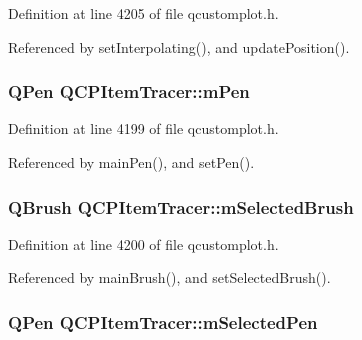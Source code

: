 Definition at line 4205 of file qcustomplot.\+h.



Referenced by set\+Interpolating(), and update\+Position().

\hypertarget{class_q_c_p_item_tracer_a579e3bd6bd16d6aaff03638dc8a99a69}{}
\subsubsection[{m\+Pen}]{\setlength{\rightskip}{0pt plus 5cm}Q\+Pen Q\+C\+P\+Item\+Tracer\+::m\+Pen\hspace{0.3cm}{\ttfamily [protected]}}\label{class_q_c_p_item_tracer_a579e3bd6bd16d6aaff03638dc8a99a69}


Definition at line 4199 of file qcustomplot.\+h.



Referenced by main\+Pen(), and set\+Pen().

\hypertarget{class_q_c_p_item_tracer_a1c15d2adde40efdcc0ef1ff78fd256a6}{}
\subsubsection[{m\+Selected\+Brush}]{\setlength{\rightskip}{0pt plus 5cm}Q\+Brush Q\+C\+P\+Item\+Tracer\+::m\+Selected\+Brush\hspace{0.3cm}{\ttfamily [protected]}}\label{class_q_c_p_item_tracer_a1c15d2adde40efdcc0ef1ff78fd256a6}


Definition at line 4200 of file qcustomplot.\+h.



Referenced by main\+Brush(), and set\+Selected\+Brush().

\hypertarget{class_q_c_p_item_tracer_a3f61829784200819661d1e2a5354d866}{}
\subsubsection[{m\+Selected\+Pen}]{\setlength{\rightskip}{0pt plus 5cm}Q\+Pen Q\+C\+P\+Item\+Tracer\+::m\+Selected\+Pen\hspace{0.3cm}{\ttfamily [protected]}}\label{class_q_c_p_item_tracer_a3f61829784200819661d1e2a5354d866}


